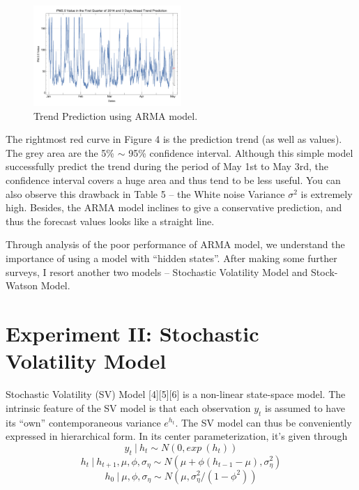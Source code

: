 \documentclass[letterpaper]{article}
\begin{document}
\begin{figure}[htbp]
	\centerline{\includegraphics[width=0.50\textwidth]{PM25_ARMATrendPrediction.pdf}}
	\caption{Trend Prediction using ARMA model.}\label{fig:digit}
\end{figure}

The rightmost red curve in Figure 4 is the prediction trend (as well as values). The grey area are the 5\% $\sim$ 95\% confidence interval. 
Although this simple model successfully predict the trend during the period of May 1st to May 3rd, the confidence interval covers a huge area and thus tend to be less useful. You can also observe this drawback in Table 5 -- the White noise Variance $\sigma^{2}$ is extremely high. Besides, the ARMA model inclines to give a conservative prediction, and thus the forecast values looks like a straight line. 

Through analysis of the poor performance of ARMA model, we understand the importance of using a model with ``hidden states''. After making some further surveys, I resort another two models -- Stochastic Volatility Model and Stock-Watson Model.   

\section{Experiment II: Stochastic Volatility Model}
Stochastic Volatility (SV) Model [4][5][6] is a non-linear state-space model. The intrinsic feature of the SV model is that each observation $y_{t}$ is assumed to have its ``own'' contemporaneous variance $e^{h_{t}}$. The SV model can thus be conveniently expressed in hierarchical form. In its center parameterization, it's given through
$$  y_{t} ~ | ~ h_{t}  \sim  N\left(0, exp ~ ( h_{t} ) \right) $$
$$  h_{t} ~ | ~ h_{t+1} , \mu, \phi, \sigma_{\eta}  \sim  N\left( \mu + \phi (h_{t-1} - \mu), \sigma_{\eta}^{2}  \right)$$
$$  h_{0} ~ | ~  \mu, \phi, \sigma_{\eta}  \sim  N\left( \mu ,  \sigma_{\eta}^{2} / (1 - \phi^{2})  \right)$$
\end{document}

